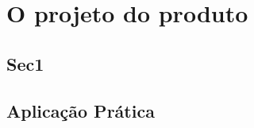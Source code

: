\chapter{O projeto do produto} 
\label{chap:projeto_do_produto} 

\section{Sec1} 
\label{sec:projeto_do_produto_sec1} 


\section{Aplicação Prática} 
\label{sec:projeto_do_produto_aplicacao}